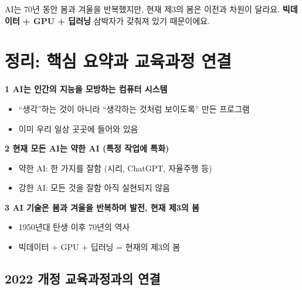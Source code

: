 \documentclass[11pt,a4paper]{article}
\begin{document}
\begin{keybox}
AI는 70년 동안 봄과 겨울을 반복했지만, 현재 제3의 봄은 이전과 차원이 달라요. \textbf{빅데이터 + GPU + 딥러닝} 삼박자가 갖춰져 있기 때문이에요.
\end{keybox}



\section{ 정리: 핵심 요약과 교육과정 연결}

\begin{summarybox}

\textbf{\large 1 AI는 인간의 지능을 모방하는 컴퓨터 시스템}
\begin{itemize}[leftmargin=*]
    \item ``생각''하는 것이 아니라 ``생각하는 것처럼 보이도록'' 만든 프로그램
    \item 이미 우리 일상 곳곳에 들어와 있음
\end{itemize}

\vspace{0.3cm}
\textbf{\large 2 현재 모든 AI는 약한 AI (특정 작업에 특화)}
\begin{itemize}[leftmargin=*]
    \item 약한 AI: 한 가지를 잘함 (시리, ChatGPT, 자율주행 등)
    \item 강한 AI: 모든 것을 잘함  아직 실현되지 않음
\end{itemize}

\vspace{0.3cm}
\textbf{\large 3 AI 기술은 봄과 겨울을 반복하며 발전, 현재 제3의 봄}
\begin{itemize}[leftmargin=*]
    \item 1950년대 탄생 이후 70년의 역사
    \item 빅데이터 + GPU + 딥러닝 = 현재의 제3의 봄
\end{itemize}
\end{summarybox}

\subsection{2022 개정 교육과정과의 연결}
\end{document}
